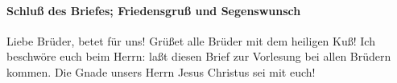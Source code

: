 \hypertarget{schluuxdf-des-briefes-friedensgruuxdf-und-segenswunsch}{%
\paragraph{Schluß des Briefes; Friedensgruß und
Segenswunsch}\label{schluuxdf-des-briefes-friedensgruuxdf-und-segenswunsch}}

 Liebe Brüder, betet für uns! Grüßet alle Brüder mit dem
heiligen Kuß!  Ich beschwöre euch beim Herrn:
 laßt diesen Brief zur Vorlesung bei allen Brüdern
kommen.  Die Gnade unsers Herrn Jesus Christus sei mit
euch!
